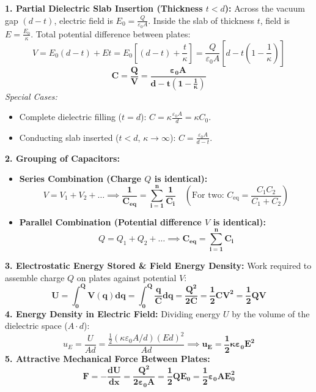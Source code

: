 \documentclass[10pt,a4paper]{article}
\begin{document}
\begin{formulabox}
\textbf{1. Partial Dielectric Slab Insertion (Thickness $t < d$):}
Across the vacuum gap $(d-t)$, electric field is $E_0 = \frac{Q}{\varepsilon_0 A}$. Inside the slab of thickness $t$, field is $E = \frac{E_0}{\kappa}$.
Total potential difference between plates:
\begin{equation}
  V = E_0 (d - t) + E t = E_0 \left[(d - t) + \frac{t}{\kappa}\right] = \frac{Q}{\varepsilon_0 A} \left[d - t\left(1 - \frac{1}{\kappa}\right)\right]
\end{equation}
\begin{equation}
  \mathbf{C = \frac{Q}{V} = \frac{\varepsilon_0 A}{d - t\left(1 - \frac{1}{\kappa}\right)}}
\end{equation}
\textit{Special Cases:}
\begin{itemize}
  \item Complete dielectric filling ($t=d$): $C = \kappa \frac{\varepsilon_0 A}{d} = \kappa C_0$.
  \item Conducting slab inserted ($t < d$, $\kappa \to \infty$): $C = \frac{\varepsilon_0 A}{d - t}$.
\end{itemize}
\textbf{2. Grouping of Capacitors:}
\begin{itemize}
  \item \textbf{Series Combination (Charge $Q$ is identical):}
  \begin{equation}
    V = V_1 + V_2 + \dots \implies \mathbf{\frac{1}{C_{\text{eq}}} = \sum_{i=1}^n \frac{1}{C_i}} \quad \left(\text{For two: } C_{\text{eq}} = \frac{C_1 C_2}{C_1 + C_2}\right)
  \end{equation}
  \item \textbf{Parallel Combination (Potential difference $V$ is identical):}
  \begin{equation}
    Q = Q_1 + Q_2 + \dots \implies \mathbf{C_{\text{eq}} = \sum_{i=1}^n C_i}
  \end{equation}
\end{itemize}
\textbf{3. Electrostatic Energy Stored \& Field Energy Density:}
Work required to assemble charge $Q$ on plates against potential $V$:
\begin{equation}
  \mathbf{U = \int_0^Q V(q) dq = \int_0^Q \frac{q}{C} dq = \frac{Q^2}{2C} = \frac{1}{2} C V^2 = \frac{1}{2} Q V}
\end{equation}
\textbf{4. Energy Density in Electric Field:}
Dividing energy $U$ by the volume of the dielectric space ($A \cdot d$):
\begin{equation}
  u_E = \frac{U}{Ad} = \frac{\frac{1}{2}(\kappa \varepsilon_0 A/d)(Ed)^2}{Ad} \implies \mathbf{u_E = \frac{1}{2} \kappa \varepsilon_0 E^2}
\end{equation}
\textbf{5. Attractive Mechanical Force Between Plates:}
\begin{equation}
  \mathbf{F = -\frac{dU}{dx} = \frac{Q^2}{2\varepsilon_0 A} = \frac{1}{2} Q E_0 = \frac{1}{2} \varepsilon_0 A E_0^2}
\end{equation}
\end{formulabox}
\end{document}
